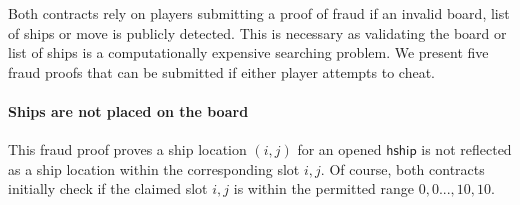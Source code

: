 \documentclass{llncs}
\newcommand{\hship}{\mathsf{hship}}
\newcommand{\hshiplocation}{\mathsf{hshiplocation}}
\newcommand{\battleshipfraud}{\mathsf{BS.fraud}}
\newcommand{\appcontract}{\mathsf{AC}}
\begin{document}
Both contracts rely on players submitting a proof of fraud if an invalid board, list of ships or move is publicly detected. 
This is necessary as validating the board or list of ships is a computationally expensive searching problem. 
We present five fraud proofs that can be submitted if either player attempts to cheat.




\paragraph{Ships are not placed on the board}
This fraud proof proves a ship location $(i,j)$ for an opened $\hship$ is not reflected as a ship location within the corresponding slot $i,j$.
Of course, both contracts initially check if the claimed slot $i,j$ is within the permitted range $0,0...,10,10$. 
\end{document}
